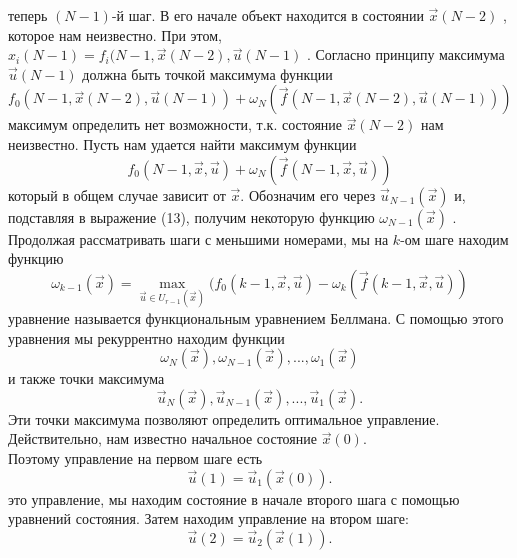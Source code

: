  теперь $(N-1)$-й шаг. В его начале объект находится в состоянии $\vec{x}(N-2)$ , которое нам неизвестно. При этом,$x_i(N-1)=f_i(N-1, \vec{x}(N-2),\vec{u}(N-1)$  . Согласно принципу максимума $\vec{u}(N-1)$ должна быть точкой максимума функции
 \begin{equation*}
f_0(N-1, \vec{x}(N-2),\vec{u}(N-1)) + \omega_N(\vec{f}(N-1,\vec{x}(N-2),\vec{u}(N-1)))
\end{equation*}
 максимум определить нет возможности, т.к. состояние $\vec{x}(N-2)$ нам неизвестно. Пусть  нам удается найти максимум функции
 \begin{equation}\label{equation_7_13}
f_0(N-1, \vec{x},\vec{u}) + \omega_N(\vec{f}(N-1,\vec{x},\vec{u}))
\end{equation}
который в общем случае зависит от $\vec{x}$. Обозначим его через $\vec{u}_{N-1}(\vec{x})$ и, подставляя в выражение (13), получим некоторую функцию $\omega_{N-1}(\vec{x})$ . Продолжая рассматривать шаги с меньшими номерами, мы на $k$-ом шаге находим функцию
 \begin{equation*}
\omega_{k-1}(\vec{x})=\max_{\vec{u}\in U_{r-1}(\vec{x})} (f_0(k-1, \vec{x},\vec{u})-\omega_{k}(\vec{f}(k-1,\vec{x},\vec{u}))
\end{equation*}
 уравнение называется функциональным уравнением Беллмана. С помощью этого уравнения мы рекуррентно находим функции
 \begin{equation*}
 \omega_{N}(\vec{x}), \omega_{N-1}(\vec{x}),...,\omega_{1}(\vec{x})
\end{equation*}
и также точки максимума
 \begin{equation*}
 \vec{u}_N(\vec{x}),  \vec{u}_{N-1}(\vec{x}),...,\vec{u}_1(\vec{x}).
\end{equation*}
\indent Эти точки максимума позволяют определить оптимальное управление. Действительно, нам известно начальное состояние $\vec{x}(0)$.\\\indent Поэтому управление на первом шаге есть
 \begin{equation*}
 \vec{u}(1) =  \vec{u}_1(\vec{x}(0)).
\end{equation*}
 это управление, мы находим состояние в начале второго шага   с помощью уравнений состояния. Затем находим управление на втором шаге:
 \begin{equation*}
 \vec{u}(2) =  \vec{u}_2(\vec{x}(1)).
\end{equation*}
